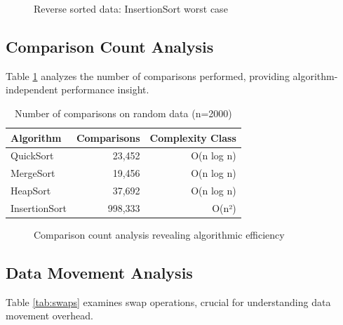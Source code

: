 \documentclass[12pt]{article}
\begin{document}
\begin{figure}[H]
    \centering
    \caption{Reverse sorted data: InsertionSort worst case}
    \label{fig:reverse_comparison}
\end{figure}

\subsection{Comparison Count Analysis}

Table \ref{tab:comparisons} analyzes the number of comparisons performed, providing algorithm-independent performance insight.

\begin{table}[H]
\centering
\caption{Number of comparisons on random data (n=2000)}
\label{tab:comparisons}
\small
\begin{tabular}{@{}lrr@{}}
\toprule
\textbf{Algorithm} & \textbf{Comparisons} & \textbf{Complexity Class} \\ 
\midrule
QuickSort       & 23,452  & O(n log n) \\ 
MergeSort       & 19,456  & O(n log n) \\ 
HeapSort        & 37,692  & O(n log n) \\ 
InsertionSort   & 998,333 & O(n²) \\ 
\bottomrule
\end{tabular}
\end{table}

\begin{figure}[H]
    \centering
    \caption{Comparison count analysis revealing algorithmic efficiency}
    \label{fig:comparisons_analysis}
\end{figure}

\subsection{Data Movement Analysis}

Table \ref{tab:swaps} examines swap operations, crucial for understanding data movement overhead.
\end{document}
